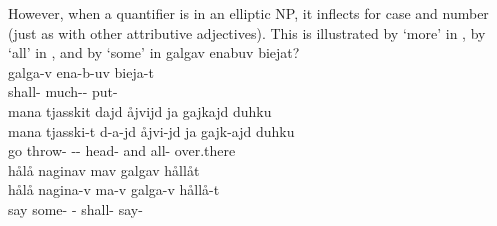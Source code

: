 However, when a quantifier is in an elliptic NP, %
it inflects for case and number (just as with other attributive adjectives). This is illustrated by  ‘more’ in , %
by  ‘all’ in , %
and by  ‘some’ in 
\ea\label{quantifierEx6}
\glll	galgav enabuv biejat?\\
	galga-v ena-b-uv bieja-t\\
	shall- much-- put-\\\nopagebreak
{}	
\z
\ea\label{quantifierEx7}
\glll	mana tjasskit dajd åjvijd ja gajkajd duhku\\
	mana tjasski-t d-a-jd åjvi-jd ja gajk-ajd duhku\\
	go\BS{} throw- -- head- and all- over.there\\\nopagebreak
{}	%
\z
\ea\label{quantifierEx8}
\glll	hålå naginav mav galgav hållåt\\
	hålå nagina-v ma-v galga-v hållå-t\\
	say\BS{} some- - shall- say-\\\nopagebreak
{}	%
\z

